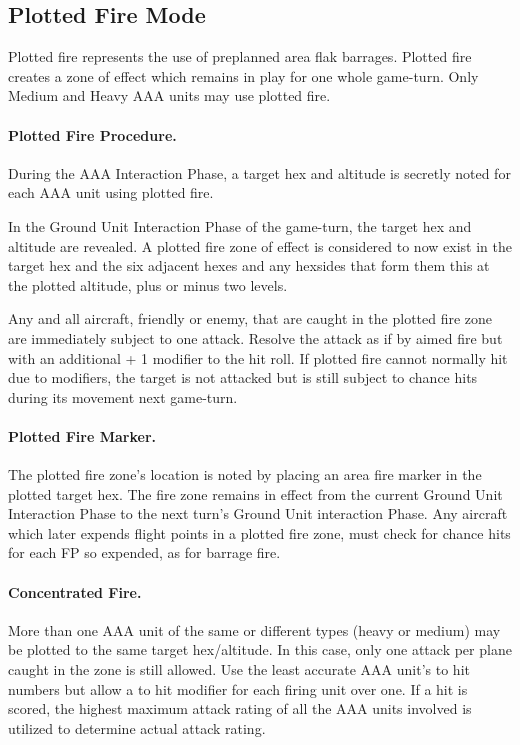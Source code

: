 \subsection{Plotted Fire Mode}

Plotted fire represents the use of preplanned area flak barrages. Plotted fire creates a zone of effect which remains in play for one whole game-turn. Only Medium and Heavy AAA units may use plotted fire.

\paragraph{Plotted Fire Procedure.} During the AAA Interaction Phase, a target hex and altitude is secretly noted for each AAA unit using plotted fire.

In the Ground Unit Interaction Phase of the game-turn, the target hex and altitude are revealed. A plotted fire zone of effect is considered to now exist in the target hex and the six adjacent hexes and any hexsides that form them this at the plotted altitude, plus or minus two levels.

Any and all aircraft, friendly or enemy, that are caught in the plotted fire zone are immediately subject to one attack. Resolve the attack as if by aimed fire but with an additional + 1 modifier to the hit roll. If plotted fire cannot normally hit due to modifiers, the target is not attacked but is still subject to chance hits during its movement next game-turn.

\paragraph{Plotted Fire Marker.} The plotted fire zone's location is noted by placing an area fire marker in the plotted target hex. The fire zone remains in effect from the current Ground Unit Interaction Phase to the next turn's Ground Unit interaction Phase. Any aircraft which later expends flight points in a plotted fire zone, must check for chance hits for each FP so expended, as for barrage fire.

\paragraph{Concentrated Fire.} More than one AAA unit of the same or different types (heavy or medium) may be plotted to the same target hex/altitude. In this case, only one attack per plane caught in the zone is still allowed. Use the least accurate AAA unit's to hit numbers but allow a  to hit modifier for each firing unit over one. If a hit is scored, the highest maximum attack rating of all the AAA units involved is utilized to determine actual attack rating.


